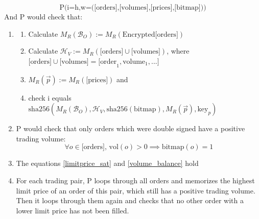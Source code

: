 \documentclass[11pt,parskip=full]{scrartcl}%
\begin{document}
\begin{appendices}
\begin{equation}
\text{P(i=h,}
\text{w=([orders],[volumes],[prices],[bitmap]))} 
\end{equation}
And P would check that:
\begin{enumerate}
\item  \begin{enumerate}
  \item Calculate $M_R(\mathcal{B}_O) := M_R(\text{Encrypted[orders]})$
    \item Calculate  $\mathcal{H}_V := M_R(\text{[orders]} \cup \text{[volumes]})$,\newline
where $\text{[orders]} \cup \text{[volumes]} = \text{[order}_1, \text{volume}_1, ...] $
  \item $M_R(\vec{p}) := M_R(\text{[prices]})$ and
    \item check i equals $ \text{sha256}(M_R(\mathcal{B}_O),\mathcal{H}_V, \text{sha256}(\text{bitmap}), M_R(\vec{p}), \text{key}_p) $
    \end{enumerate}
\item P would check that only orders which were double signed have a positive trading volume:
\begin{equation}
\forall o \in \text{[orders], vol}(o)>0 \implies \text{bitmap}(o) = 1 
\end{equation}
\item The equations \ref{limitprice_sat} and \ref{volume_balance} hold
\item For each trading pair, P loops through all orders and memorizes the highest limit price of an order of this pair, which still has a positive trading volume. 
Then it loops through them again and checks that no other order with a lower limit price has not been filled. 
\end{enumerate}


\end{appendices}
\end{document}
